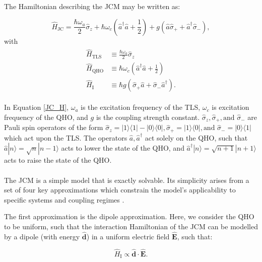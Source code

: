 \documentclass[11pt]{article}
\begin{document}
\noindent The Hamiltonian describing the JCM may be written as:

\begin{equation} \label{JC_H}
    \hat{H}_{\scriptscriptstyle \text{JC}} = \frac{\hbar\omega_a}{2}\hat{\sigma}_z + \hbar\omega_c\left(\hat{a}^\dagger \hat{a} + \frac{1}{2} \right) + g(\hat{a}\hat{\sigma}_{+} + \hat{a}^\dagger\hat{\sigma}_{-}), 
\end{equation} 
with 
\begin{align*}
    \begin{aligned}
        \hat{H}_{\scriptscriptstyle \text{TLS}} &\equiv \frac{\hbar\omega_a}{2}\hat{\sigma}_z \\
        \hat{H}_{\scriptscriptstyle \text{QHO}} &\equiv \hbar\omega_c\left(\hat{a}^\dagger \hat{a} + \frac{1}{2} \right) \\
        \hat{H}_{\scriptscriptstyle \text{I}} &\equiv \hbar g(\hat{\sigma}_{+}\hat{a} +\hat{\sigma}_{-}\hat{a}^\dagger).
    \end{aligned}
\end{align*}

In Equation \eqref{JC_H}, $\omega_a$ is the excitation frequency of the TLS, $\omega_c$ is excitation frequency of the QHO, and $g$ is the coupling strength constant. $\hat{\sigma}_z, \hat{\sigma}_+, \text{and } \hat{\sigma}_-$ are Pauli spin operators of the form $\hat{\sigma}_z = |1\rangle\langle1| - |0\rangle\langle0|, \hat{\sigma}_+ = |1\rangle\langle0|, \text{and } \hat{\sigma}_- = |0\rangle\langle1|$ which act upon the TLS. The operators $\hat{a}, \hat{a}^\dagger$ act solely on the QHO, such that $\hat{a}|n\rangle = \sqrt{n}|n-1\rangle$ acts to lower the state of the QHO, and $\hat{a}^{\dagger}|n\rangle = \sqrt{n+1}|n+1\rangle$ acts to raise the state of the QHO.\\
\\
The JCM is a simple model that is exactly solvable. Its simplicity arises from a set of four key approximations which constrain the model’s applicability to specific systems and coupling regimes \cite{General2024-JC_overview}. 

The first approximation is the dipole approximation. Here, we consider the QHO to be uniform, such that the interaction Hamiltonian of the JCM can be modelled by a dipole (with energy $\boldsymbol{\hat{d}}$) in a uniform electric field $\boldsymbol{\hat{E}}$, such that:

\begin{equation*}
    \hat{H}_{\scriptscriptstyle \text{I}} \propto \boldsymbol{\hat{d}} \cdot \boldsymbol{\hat{E}}.
\end{equation*}
\end{document}
